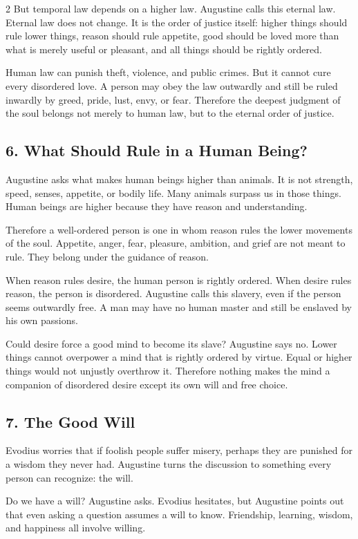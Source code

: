 \documentclass[12pt]{article}
\begin{document}
\begin{multicols}{2}
But temporal law depends on a higher law. Augustine calls this eternal law. Eternal law does not change. It is the order of justice itself: higher things should rule lower things, reason should rule appetite, good should be loved more than what is merely useful or pleasant, and all things should be rightly ordered.

Human law can punish theft, violence, and public crimes. But it cannot cure every disordered love. A person may obey the law outwardly and still be ruled inwardly by greed, pride, lust, envy, or fear. Therefore the deepest judgment of the soul belongs not merely to human law, but to the eternal order of justice.

\subsection*{6. What Should Rule in a Human Being?}
Augustine asks what makes human beings higher than animals. It is not strength, speed, senses, appetite, or bodily life. Many animals surpass us in those things. Human beings are higher because they have reason and understanding.

Therefore a well-ordered person is one in whom reason rules the lower movements of the soul. Appetite, anger, fear, pleasure, ambition, and grief are not meant to rule. They belong under the guidance of reason.

When reason rules desire, the human person is rightly ordered. When desire rules reason, the person is disordered. Augustine calls this slavery, even if the person seems outwardly free. A man may have no human master and still be enslaved by his own passions.

Could desire force a good mind to become its slave? Augustine says no. Lower things cannot overpower a mind that is rightly ordered by virtue. Equal or higher things would not unjustly overthrow it. Therefore nothing makes the mind a companion of disordered desire except its own will and free choice.

\subsection*{7. The Good Will}
Evodius worries that if foolish people suffer misery, perhaps they are punished for a wisdom they never had. Augustine turns the discussion to something every person can recognize: the will.

Do we have a will? Augustine asks. Evodius hesitates, but Augustine points out that even asking a question assumes a will to know. Friendship, learning, wisdom, and happiness all involve willing.


\end{multicols}
\end{document}
